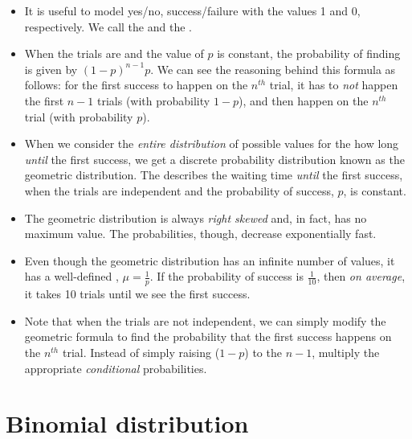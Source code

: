 \begin{itemize}
\item It is useful to model yes/no, success/failure with the values 1 and 0, respectively. We call the and the .

\item When the trials are  and the value of $p$ is constant, the probability of finding  is given by $(1-p)^{n-1}p$.  We can see the reasoning behind this formula as follows:  for the first success to happen on the $n^{th}$ trial, it has to \emph{not} happen the first $n-1$ trials (with probability $1-p$), and then happen on the $n^{th}$ trial (with probability $p$).  

\item When we consider the \emph{entire distribution} of possible values for the how long \emph{until} the first success, we get a discrete probability distribution known as the geometric distribution. The  describes the waiting time \emph{until} the first success, when the trials are independent and the probability of success, $p$, is constant.

\item The geometric distribution is always \emph{right skewed} and, in fact, has no maximum value.  The probabilities, though, decrease exponentially fast.

\item Even though the geometric distribution has an infinite number of values, it has a well-defined , $\mu=\frac{1}{p}$.  If the probability of success is $\frac{1}{10}$, then \emph{on average}, it takes 10 trials until we see the first success.

\item Note that when the trials are not independent, we can simply modify the geometric formula to find the probability that the first success happens on the $n^{th}$ trial. Instead of simply raising ($1-p$) to the $n-1$, multiply the appropriate \emph{conditional} probabilities.

\end{itemize}


{}



\section[Binomial distribution]{Binomial distribution }
\label{binomialModel}

